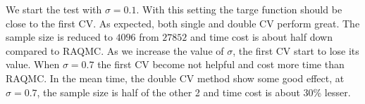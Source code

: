 We start the test with $\sigma=0.1$. 
With this setting the targe function should be close to the first CV. 
As expected, both single and double CV perform great. The sample size is reduced to $4096$ from $27852$ and time cost is about half down compared to RAQMC. 
As we increase the value of $\sigma$, the first CV start to lose its value. 
When $\sigma=0.7$ the first CV become not helpful and cost more time than RAQMC. In the mean time, the double CV method show some good effect, at $\sigma=0.7$, the sample size is half of the other 2 and time cost is about 30\% lesser.

